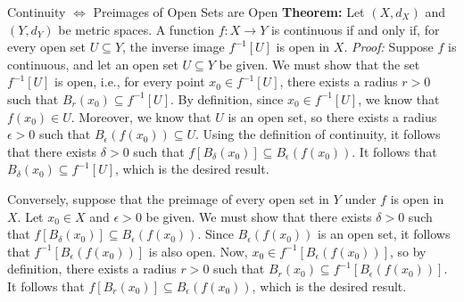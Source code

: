 \documentclass[12pt]{article}
\begin{document}
\begin{thmbox}{Continuity $\iff$ Preimages of Open Sets are Open}
	\textbf{Theorem:} Let $(X, d_X)$ and $(Y, d_Y)$ be metric spaces. A function $f: X \to Y$ is continuous if and only if, for every open set $U \subseteq Y$, the inverse image $f^{-1}[U]$ is open in $X$.
\tcblower
	\textit{Proof:} Suppose $f$ is continuous, and let an open set $U \subseteq Y$ be given. We must show that the set $f^{-1}[U]$ is open, i.e., for every point $x_0 \in f^{-1}[U]$, there exists a radius $r > 0$ such that $B_r(x_0) \subseteq f^{-1}[U]$. By definition, since $x_0 \in f^{-1}[U]$, we know that $f(x_0) \in U$. Moreover, we know that $U$ is an open set, so there exists a radius $\epsilon > 0$ such that $B_\epsilon(f(x_0)) \subseteq U$. Using the definition of continuity, it follows that there exists $\delta > 0$ such that $f[B_\delta(x_0)] \subseteq B_\epsilon(f(x_0))$. It follows that $B_\delta(x_0) \subseteq f^{-1}[U]$, which is the desired result.
	
	Conversely, suppose that the preimage of every open set in $Y$ under $f$ is open in $X$. Let $x_0 \in X$ and $\epsilon > 0$ be given. We must show that there exists $\delta > 0$ such that $f[B_\delta(x_0)] \subseteq B_\epsilon(f(x_0))$. Since $B_\epsilon(f(x_0))$ is an open set, it follows that $f^{-1}[B_\epsilon(f(x_0))]$ is also open. Now, $x_0 \in f^{-1}[B_\epsilon(f(x_0))]$, so by definition, there exists a radius $r > 0$ such that $B_r(x_0) \subseteq f^{-1}[B_\epsilon(f(x_0))]$. It follows that $f[B_r(x_0)] \subseteq B_\epsilon(f(x_0))$, which is the desired result.
\end{thmbox}

\clearpage
\listofdefinition
\listoftheorem
\end{document}
